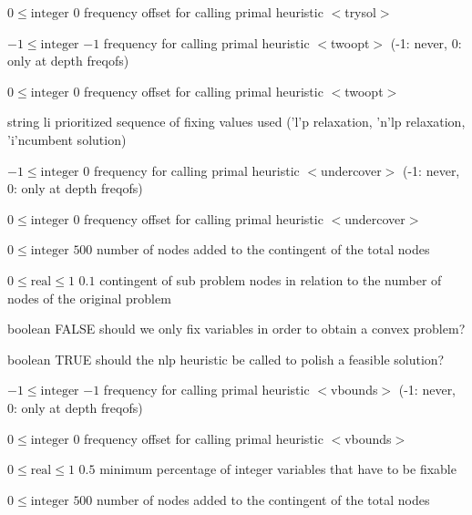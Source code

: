 %
{$0\leq\textrm{integer}$}%
{$0$}%
{frequency offset for calling primal heuristic $<$trysol$>$}%
{}

%
{$-1\leq\textrm{integer}$}%
{$-1$}%
{frequency for calling primal heuristic $<$twoopt$>$ (-1: never, 0: only at depth freqofs)}%
{}

%
{$0\leq\textrm{integer}$}%
{$0$}%
{frequency offset for calling primal heuristic $<$twoopt$>$}%
{}

%
{string}%
{li}%
{prioritized sequence of fixing values used ('l'p relaxation, 'n'lp relaxation, 'i'ncumbent solution)}%
{}

%
{$-1\leq\textrm{integer}$}%
{$0$}%
{frequency for calling primal heuristic $<$undercover$>$ (-1: never, 0: only at depth freqofs)}%
{}

%
{$0\leq\textrm{integer}$}%
{$0$}%
{frequency offset for calling primal heuristic $<$undercover$>$}%
{}

%
{$0\leq\textrm{integer}$}%
{$500$}%
{number of nodes added to the contingent of the total nodes}%
{}

%
{$0\leq\textrm{real}\leq1$}%
{$0.1$}%
{contingent of sub problem nodes in relation to the number of nodes of the original problem}%
{}

%
{boolean}%
{FALSE}%
{should we only fix variables in order to obtain a convex problem?}%
{}

%
{boolean}%
{TRUE}%
{should the nlp heuristic be called to polish a feasible solution?}%
{}

%
{$-1\leq\textrm{integer}$}%
{$-1$}%
{frequency for calling primal heuristic $<$vbounds$>$ (-1: never, 0: only at depth freqofs)}%
{}

%
{$0\leq\textrm{integer}$}%
{$0$}%
{frequency offset for calling primal heuristic $<$vbounds$>$}%
{}

%
{$0\leq\textrm{real}\leq1$}%
{$0.5$}%
{minimum percentage of integer variables that have to be fixable }%
{}

%
{$0\leq\textrm{integer}$}%
{$500$}%
{number of nodes added to the contingent of the total nodes}%
{}

